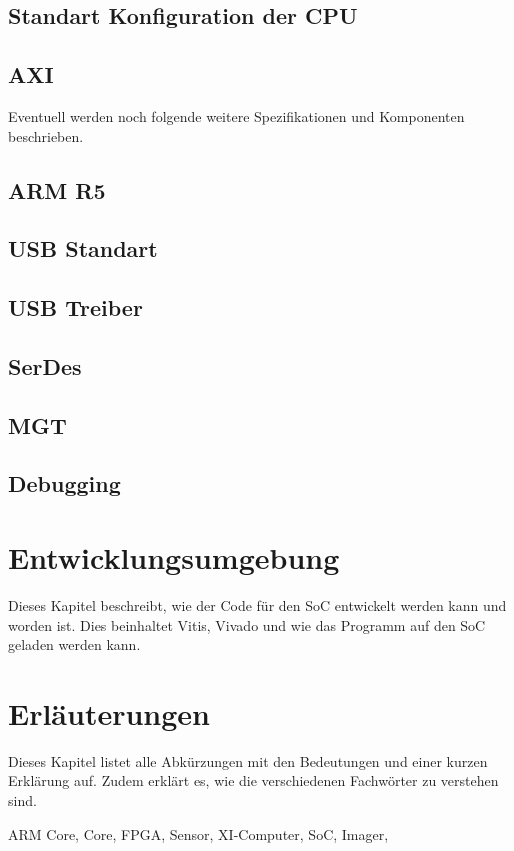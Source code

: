 \documentclass{article}
\begin{document}
\subsection{Standart Konfiguration der CPU}
\subsection{AXI}

Eventuell werden noch folgende weitere Spezifikationen und Komponenten be\-schrieben.
\subsection{ARM R5}
\subsection{USB Standart}
\subsection{USB Treiber}
\subsection{SerDes}
\subsection{MGT}
\subsection{Debugging}



\section{Entwicklungsumgebung}
Dieses Kapitel beschreibt, wie der Code für den SoC entwickelt werden kann und worden ist. Dies beinhaltet Vitis, Vivado und wie das Programm auf den SoC geladen werden kann.

\section{Erläuterungen}
Dieses Kapitel listet alle Abkürzungen mit den Bedeutungen und einer kurzen Erklärung auf. Zudem erklärt es, wie die verschiedenen Fachwörter zu verstehen sind.

ARM Core,
Core,
FPGA,
Sensor,
XI-Computer,
SoC,
Imager,
\end{document}
